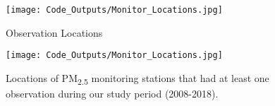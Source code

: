 
\begin{figure} 
\centering  
\texttt{[image: Code\_Outputs/Monitor\_Locations.jpg]} 
\caption{\label{fig:MonitorLocations}Observation Locations} 
\end{figure} 
 

\begin{figure} 
\centering  
\texttt{[image: Code\_Outputs/Monitor\_Locations.jpg]} 
\caption{\label{fig:MonitorLocations}Locations of PM\textsubscript{2.5} monitoring stations that had at least one observation during our study period (2008-2018).} 
\end{figure} 
 
